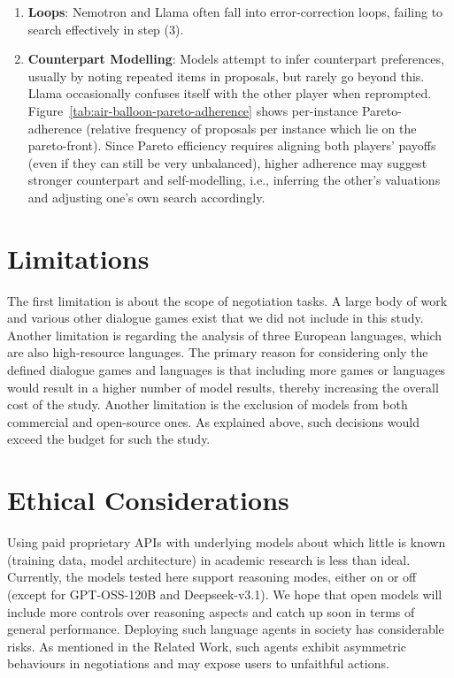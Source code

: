 \documentclass[11pt]{article}
\begin{document}
\begin{enumerate}
\item \textbf{Loops}: Nemotron and Llama often fall into error-correction loops, failing to search effectively in step (3). 
\item \textbf{Counterpart Modelling}: Models attempt to infer counterpart preferences, usually by noting repeated items in proposals, but rarely go beyond this. Llama occasionally confuses itself with the other player when reprompted. Figure~\ref{tab:air-balloon-pareto-adherence} shows per-instance Pareto-adherence (relative frequency of proposals per instance which lie on the pareto-front). Since Pareto efficiency requires aligning both players’ payoffs (even if they can still be very unbalanced), higher adherence may suggest stronger counterpart and self-modelling, i.e., inferring the other’s valuations and adjusting one’s own search accordingly.
\end{enumerate}

\section*{Limitations}

The first limitation is about the scope of negotiation tasks. A large body of work and various other dialogue games exist that we did not include in this study. Another limitation is regarding the analysis of three European languages, which are also high-resource languages. The primary reason for considering only the defined dialogue games and languages is that including more games or languages would result in a higher number of model results, thereby increasing the overall cost of the study. Another limitation is the exclusion of models from both commercial and open-source ones. As explained above, such decisions would exceed the budget for such the study.

\section*{Ethical Considerations}

Using paid proprietary APIs with underlying models about which little is known (training data, model architecture) in academic research is less than ideal. Currently, the models tested here support reasoning modes, either on or off (except for GPT-OSS-120B and Deepseek-v3.1). We hope that open models will include more controls over reasoning aspects and catch up soon in terms of general performance. Deploying such language agents in society has considerable risks. As mentioned in the Related Work, such agents exhibit asymmetric behaviours in negotiations and may expose users to unfaithful actions.
\end{document}
